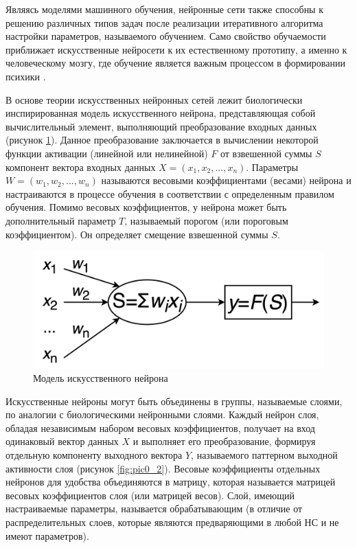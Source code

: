 Являясь моделями машинного обучения, нейронные сети также способны к решению различных типов задач после реализации итеративного алгоритма настройки параметров, называемого обучением. Само свойство обучаемости приближает искусственные нейросети к их естественному прототипу, а именно к человеческому мозгу, где обучение является важным процессом в формировании психики \cite{kandel}.

В основе теории искусственных нейронных сетей лежит биологически инспирированная модель искусственного нейрона, представляющая собой вычислительный элемент, выполняющий преобразование входных данных (рисунок \ref{fig:pic0_1}). Данное преобразование заключается в вычислении некоторой функции активации (линейной или нелинейной) $F$ от взвешенной суммы $S$ компонент вектора входных данных $X = (x_1, x_2, ..., x_n)$. Параметры $W = (w_1, w_2, ..., w_n)$ называются весовыми коэффициентами (весами) нейрона и настраиваются в процессе обучения в соответствии с определенным правилом обучения. Помимо весовых коэффициентов, у нейрона может быть дополнительный параметр $T$, называемый порогом (или пороговым коэффициентом). Он определяет смещение взвешенной суммы $S$.

\begin{figure}[H]
  \centering
  \includegraphics[width=\textwidth]{man-source/images/ch1/pic0-1.png}
  \caption{Модель искусственного нейрона}
  \label{fig:pic0_1}
\end{figure}

Искусственные нейроны могут быть объединены в группы, называемые слоями, по аналогии с биологическими нейронными слоями. Каждый нейрон слоя, обладая независимым набором весовых коэффициентов, получает на вход одинаковый вектор данных $X$ и выполняет его преобразование, формируя отдельную компоненту выходного вектора $Y$, называемого паттерном выходной активности слоя \cite{golovko2017} (рисунок \ref{fig:pic0_2}). Весовые коэффициенты отдельных нейронов для удобства объединяются в матрицу, которая называется матрицей весовых коэффициентов слоя (или матрицей весов). Слой, имеющий настраиваемые параметры, называется обрабатывающим (в отличие от распределительных слоев, которые являются предваряющими в любой НС и не имеют параметров).

